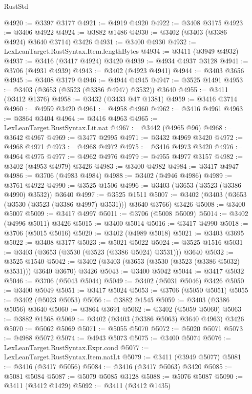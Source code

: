\begin{lexlean}{RustStd}
\begin{coremodule}
@4920 := @3397 @3177
@4921 := @4919 @4920
@4922 := @3408 @3175
@4923 := @3406 @4922
@4924 := @3882 @1486
@4930 := @3402 (@3403 (@3386 @4924) @3640 @3714) @3426
@4931 := @3400 @4930
@4932 := LexLeanTarget.RustSyntax.Item.lengthBytes
@4934 := @3411 (@3949 @4932)
@4937 := @3416 (@3417 @4924) @3420
@4939 := @4934 @4937 @3128
@4941 := @3706 (@4931 @4939)
@4943 := @3402 (@4923 @4941)
@4944 := @3403 @3656
@4945 := @3408 @3179
@4946 := @4944 @4945
@4947 := @3525 @1491
@4953 := @3403 (@3653 (@3523 (@3386 @4947) @3532)) @3640
@4955 := @3411 (@3412 @1376)
@4958 := @3432 (@3433 @47 @1381)
@4959 := @3416 @3714
@4960 := @4959 @3420
@4961 := @4958 @4960
@4962 := @3416 @4961
@4963 := @3864 @3404
@4964 := @3416 @4963
@4965 := LexLeanTarget.RustSyntax.Lit.nat
@4967 := @3442 (@4965 @96)
@4968 := @3642 @4967
@4969 := @3477 @2995
@4971 := @3432 @4969 @3420
@4972 := @4968 @4971
@4973 := @4968 @4972
@4975 := @3416 @4973 @3420
@4976 := @4964 @4975
@4977 := @4962 @4976
@4979 := @4955 @4977 @3157
@4982 := @3402 (@4953 @4979) @3426
@4983 := @3400 @4982
@4984 := @3417 @4947
@4986 := @3706 (@4983 @4984)
@4988 := @3402 (@4946 @4986)
@4989 := @3761 @4922
@4990 := @3525 @1506
@4996 := @3403 (@3653 (@3523 (@3386 @4990) @3532)) @3640
@4997 := @3525 @1511
@5007 := @3402 (@3403 (@3653 (@3530 (@3523 (@3386 @4997) @3531))) @3640 @3766) @3426
@5008 := @3400 @5007
@5009 := @3417 @4997
@5011 := @3706 (@5008 @5009)
@5014 := @3402 (@4996 @5011) @3426
@5015 := @3400 @5014
@5016 := @3417 @4990
@5018 := @3706 (@5015 @5016)
@5020 := @3402 (@4989 @5018)
@5021 := @3403 @3695
@5022 := @3408 @3177
@5023 := @5021 @5022
@5024 := @3525 @1516
@5031 := @3403 (@3653 (@3530 (@3523 (@3386 @5024) @3531))) @3640
@5032 := @3525 @1540
@5042 := @3402 (@3403 (@3653 (@3530 (@3523 (@3386 @5032) @3531))) @3640 @3670) @3426
@5043 := @3400 @5042
@5044 := @3417 @5032
@5046 := @3706 (@5043 @5044)
@5049 := @3402 (@5031 @5046) @3426
@5050 := @3400 @5049
@5051 := @3417 @5024
@5053 := @3706 (@5050 @5051)
@5055 := @3402 (@5023 @5053)
@5056 := @3882 @1545
@5059 := @3403 (@3386 @5056) @3640
@5060 := @3864 @3691
@5062 := @3402 (@5059 @5060)
@5063 := @3882 @1568
@5069 := @3402 (@3403 (@3386 @5063) @3640 @4963) @3426
@5070 := @5062 @5069
@5071 := @5055 @5070
@5072 := @5020 @5071
@5073 := @4988 @5072
@5074 := @4943 @5073
@5075 := @3400 @5074
@5076 := LexLeanTarget.RustSyntax.Expr.cond
@5077 := LexLeanTarget.RustSyntax.Item.natLt
@5079 := @3411 (@3949 @5077)
@5081 := @3416 (@3417 @5056)
@5084 := @3416 (@3417 @5063) @3420
@5085 := @5081 @5084
@5087 := @5079 @5085 @3128
@5088 := @5076 @5087
@5090 := @3411 (@3412 @1429)
@5092 := @3411 (@3412 @1435)

\end{coremodule}
\end{lexlean}
